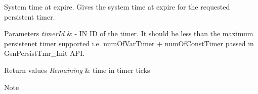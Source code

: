 System time at expire. Gives the system time at expire for the requested persistent timer. 


\begin{DoxyParams}{Parameters}
{\em timerId} & -\/ IN ID of the timer. It should be less than the maximum persistenet timer supported i.e. numOfVarTimer + numOfConstTimer passed in GsnPersistTmr\_\-Init API. \\
\hline
\end{DoxyParams}

\begin{DoxyRetVals}{Return values}
{\em Remaining} & time in timer ticks \\
\hline
\end{DoxyRetVals}
\begin{DoxyNote}{Note}

\end{DoxyNote}
